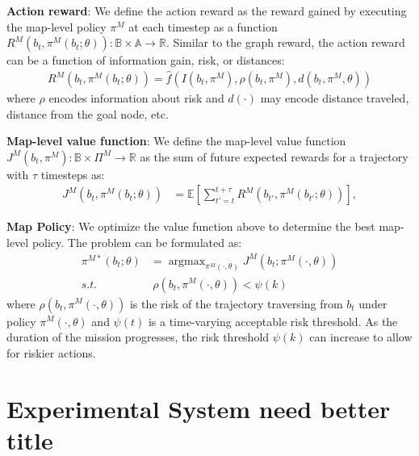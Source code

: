 \documentclass[letterpaper, 10 pt, conference]{ieeeconf}  %
\newcommand{\ph}[1]{{\textbf{#1}:}} %
\newcommand{\todo}[1]{{\color{red} #1 }} %
\newcommand{\argmax}{\mathop{\mathrm{argmax}}}
\begin{document}
\ph{Action reward}
We define the action reward as the reward gained by executing the map-level policy $\pi^M$ at each timestep as a function $R^M(b_t, \pi^M(b_t;\theta)): \mathbb{B} \times \mathbb{A} \to \mathbb{R}$.  
Similar to the graph reward, the action reward can be a function of information gain, risk, or distances:
\begin{align}
    R^M(b_t, \pi^M(b_t;\theta)) = \hat{f}(I(b_t,\pi^M),\rho(b_t,\pi^M),d(b_t,\pi^M,\theta))
\end{align}
where $\rho$ encodes information about risk and $d(\cdot)$ may encode distance traveled, distance from the goal node, etc.

\ph{Map-level value function}
We define the map-level value function $J^M(b_t, \pi^M): \mathbb{B} \times \Pi^M \to \mathbb{R}$ as the sum of future expected rewards for a trajectory with $\tau$ timesteps as:
\begin{align}
  J^M(b_t,\pi^M(b_t;\theta)) &= \mathbb{E} \left[ \sum_{t'=t}^{t+\tau} R^M(b_{t'},\pi^M(b_{t'};\theta))\right], \label{eq:localplan_cost}
\end{align}

\ph{Map Policy}
We optimize the value function above to determine the best map-level policy.  The problem can be formulated as:
\begin{align}
  \pi^{M*}(b_t;\theta) &= \argmax_{\pi^M(\cdot,\theta)} J^M(b_t;\pi^M(\cdot,\theta))
  \nonumber \\
  s.t.~&~\rho(b_t,\pi^M(\cdot,\theta)) < \psi(k)
  \label{eq:mapopt}
\end{align}
where $\rho(b_t,\pi^M(\cdot,\theta))$ is the risk of the trajectory traversing from $b_t$ under policy $\pi^M(\cdot,\theta)$ and $\psi(t)$ is a time-varying acceptable risk threshold.  As the duration of the mission progresses, the risk threshold $\psi(k)$ can increase to allow for riskier actions.



\section{Experimental System \todo{need better title}} \label{sec:hierarchical}
\end{document}
